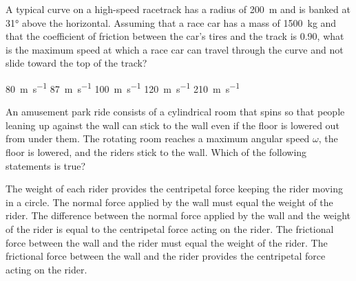 \documentclass{../../oss-classkick-exam}
\begin{document}
\begin{multicols*}{2}
\begin{questions}
    \question A typical curve on a high-speed racetrack has a radius of
    \SI{200}{\metre} and is banked at \ang{31} above the horizontal. Assuming
    that a race car has a mass of \SI{1500}{\kilo\gram} and that the
    coefficient of friction between the car's tires and the track is 0.90, what
    is the maximum speed at which a race car can travel through the curve and
    not slide toward the top of the track?
    \begin{choices}
      \choice\SI{80}{\metre\per\second}
      \choice\SI{87}{\metre\per\second}
      \choice\SI{100}{\metre\per\second}
      \choice\SI{120}{\metre\per\second}
      \choice\SI{210}{\metre\per\second}
    \end{choices}
    \columnbreak
    
    
    \question An amusement park ride consists of a cylindrical room that spins
    so that people leaning up against the wall can stick to the wall even if the
    floor is lowered out from under them. The rotating room reaches a maximum
    angular speed $\omega$, the floor is lowered, and the riders stick to
    the wall. Which of the following statements is true?
    \begin{choices}
      \choice The weight of each rider provides the centripetal force keeping
      the rider moving in a circle.
      \choice The normal force applied by the wall must equal the weight of the
      rider.
      \choice The difference between the normal force applied by the wall and
      the weight of the rider is equal to the centripetal force acting on the
      rider.
      \choice The frictional force between the wall and the rider must equal the
      weight of the rider.
      \choice The frictional force between the wall and the rider provides the
      centripetal force acting on the rider.
    \end{choices}
    \vspace{.7in}

\end{questions}
\end{multicols*}
\end{document}
